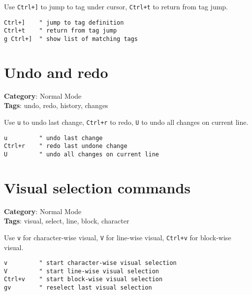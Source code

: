 {{{{{{{{{Use {\footnotesize \Verb§Ctrl+]§} to jump to tag under cursor, {\footnotesize \Verb§Ctrl+t§} to return from tag jump.

\begin{Exa*}{}
\begin{Verbatim}[fontsize=\footnotesize, breaklines, breakanywhere]
Ctrl+]    " jump to tag definition
Ctrl+t    " return from tag jump
g Ctrl+]  " show list of matching tags
\end{Verbatim}
\end{Exa*}

\section{Undo and redo}

\textbf{Category}: Normal Mode\\ \textbf{Tags}: undo, redo, history, changes
\vspace{0.5cm}

Use {\footnotesize \Verb§u§} to undo last change, {\footnotesize \Verb§Ctrl+r§} to redo, {\footnotesize \Verb§U§} to undo all changes on current line.

\begin{Exa*}{}
\begin{Verbatim}[fontsize=\footnotesize, breaklines, breakanywhere]
u         " undo last change
Ctrl+r    " redo last undone change
U         " undo all changes on current line
\end{Verbatim}
\end{Exa*}

\section{Visual selection commands}

\textbf{Category}: Normal Mode\\ \textbf{Tags}: visual, select, line, block, character
\vspace{0.5cm}

Use {\footnotesize \Verb§v§} for character-wise visual, {\footnotesize \Verb§V§} for line-wise visual, {\footnotesize \Verb§Ctrl+v§} for block-wise visual.

\begin{Exa*}{}
\begin{Verbatim}[fontsize=\footnotesize, breaklines, breakanywhere]
v         " start character-wise visual selection
V         " start line-wise visual selection
Ctrl+v    " start block-wise visual selection
gv        " reselect last visual selection
\end{Verbatim}
\end{Exa*}

}}}}}}}}}
